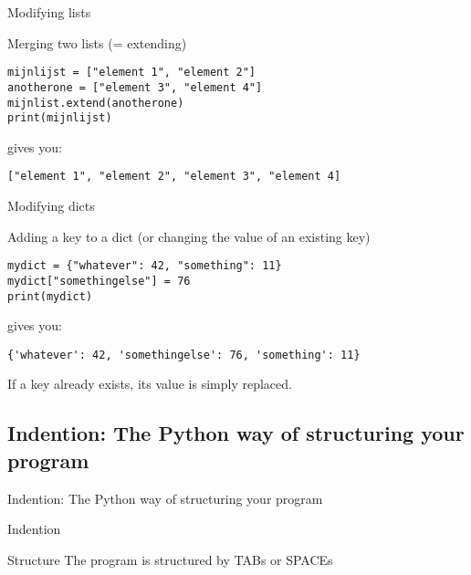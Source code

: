 \documentclass{beamer}
\begin{document}
\begin{frame}[fragile]{Modifying lists}
\begin{block}{Merging two lists (= extending)}
\begin{lstlisting}
mijnlijst = ["element 1", "element 2"]
anotherone = ["element 3", "element 4"]
mijnlist.extend(anotherone)
print(mijnlijst)
\end{lstlisting}
gives you:
\begin{lstlisting}
["element 1", "element 2", "element 3", "element 4]
\end{lstlisting}
\end{block}
\end{frame}




\begin{frame}[fragile]{Modifying dicts}
\begin{block}{Adding a key to a dict (or changing the value of an existing key)}
\begin{lstlisting}
mydict = {"whatever": 42, "something": 11}
mydict["somethingelse"] = 76
print(mydict)
\end{lstlisting}
gives you:
\begin{lstlisting}
{'whatever': 42, 'somethingelse': 76, 'something': 11}
\end{lstlisting}
If a key already exists, its value is simply replaced.
\end{block}
\end{frame}




\subsection[Indention]{Indention: The Python way of structuring your program}
\begin{frame}[plain]
Indention: The Python way of structuring your program
\end{frame}


\begin{frame}[fragile]{Indention}
\begin{block}{Structure}
The program is structured by TABs or SPACEs
\end{block}

\end{frame}



{
\begin{frame}[plain]
\end{frame}
}
\end{document}
